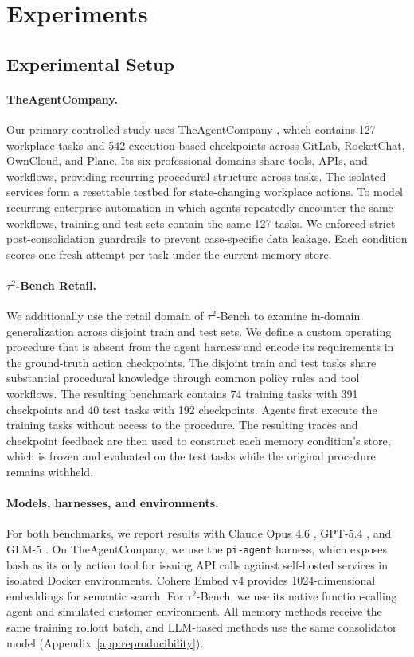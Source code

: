 \section{Experiments}
\label{sec:experiments}

\subsection{Experimental Setup}
\label{sec:setup}

\paragraph{TheAgentCompany.}
Our primary controlled study uses TheAgentCompany
\citep{theagentcompany}, which contains 127 workplace tasks and 542
execution-based checkpoints across GitLab, RocketChat, OwnCloud, and Plane.
Its six professional domains share tools, APIs, and workflows, providing
recurring procedural structure across tasks. The isolated services form a
resettable testbed for state-changing workplace actions. To model recurring
enterprise automation in which agents repeatedly encounter the same workflows,
training and test sets contain the same 127 tasks. We enforced strict post-consolidation guardrails to prevent case-specific data leakage. Each condition scores one
fresh attempt per task under the current memory store.

\paragraph{$\tau^2$-Bench Retail.}
We additionally use the retail domain of $\tau^2$-Bench
\citep{tau2bench} to examine in-domain generalization across disjoint train and
test sets. We define a custom operating procedure that is absent from the agent
harness and encode its requirements in the ground-truth action checkpoints. The
disjoint train and test tasks share substantial procedural knowledge through
common policy rules and tool workflows. The resulting benchmark contains 74
training tasks with 391 checkpoints and 40 test tasks with 192 checkpoints. Agents first execute the training
tasks without access to the procedure. The resulting traces and checkpoint
feedback are then used to construct each memory condition's store, which is
frozen and evaluated on the test tasks while the original procedure remains
withheld. 

\paragraph{Models, harnesses, and environments.}
For both benchmarks, we report results with Claude Opus 4.6 \citep{claudeopus46}, GPT-5.4 \citep{gpt54}, and
GLM-5 \citep{glm5}. On TheAgentCompany, we use the \texttt{pi-agent}
harness, which exposes bash as its only action tool for issuing API calls
against self-hosted services in isolated Docker environments. Cohere Embed v4
provides 1024-dimensional embeddings for semantic search. For $\tau^2$-Bench,
we use its native function-calling agent and simulated customer environment.
All memory methods receive the same training rollout batch, and LLM-based
methods use the same consolidator model
(Appendix~\ref{app:reproducibility}).

